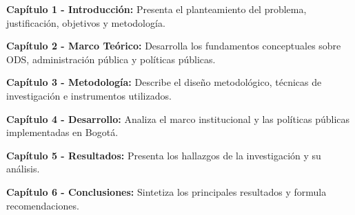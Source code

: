 \textbf{Capítulo 1 - Introducción:} Presenta el planteamiento del problema, justificación, objetivos y metodología.

\textbf{Capítulo 2 - Marco Teórico:} Desarrolla los fundamentos conceptuales sobre ODS, administración pública y políticas públicas.

\textbf{Capítulo 3 - Metodología:} Describe el diseño metodológico, técnicas de investigación e instrumentos utilizados.

\textbf{Capítulo 4 - Desarrollo:} Analiza el marco institucional y las políticas públicas implementadas en Bogotá.

\textbf{Capítulo 5 - Resultados:} Presenta los hallazgos de la investigación y su análisis.

\textbf{Capítulo 6 - Conclusiones:} Sintetiza los principales resultados y formula recomendaciones.
